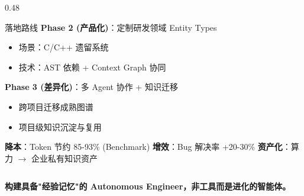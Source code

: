 \documentclass[aspectratio=169,10pt]{beamer}
\begin{document}
\begin{frame}
\begin{columns}[T]
\begin{column}{0.48\textwidth}
\begin{block}{落地路线}
        \vspace{0.05cm}
        \textbf{Phase 2 (产品化)}：定制研发领域 Entity Types
        \begin{itemize}
            \item 场景：C/C++ 遗留系统
            \item 技术：AST 依赖 + Context Graph 协同
        \end{itemize}

        \vspace{0.05cm}
        \textbf{Phase 3 (差异化)}：多 Agent 协作 + 知识迁移
        \begin{itemize}
            \item 跨项目迁移成熟图谱
            \item 项目级知识沉淀与复用
        \end{itemize}
      \end{block}

      \vspace{0.05cm}

      \begin{tcolorbox}[colback=layer1, title=\textbf{业务价值}]
        \scriptsize
        \textbf{降本}：Token 节约 85-93\% (Benchmark)
        \newline \textbf{增效}：Bug 解决率 +20-30\%
        \newline \textbf{资产化}：算力 $\to$ 企业私有知识资产
      \end{tcolorbox}
    \end{column}
  \end{columns}

  \vspace{0.15cm}
  \centering
  \textbf{\scriptsize 构建具备"经验记忆"的 Autonomous Engineer，非工具而是进化的智能体。}
\end{frame}
\end{document}
